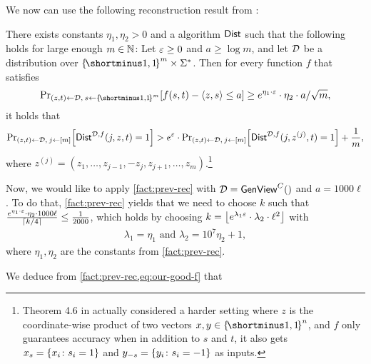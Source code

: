 We now can use the following reconstruction result from \cite{HaitnerMST22}:


\begin{fact}\label{fact:prev-rec}
	There exists constants $\eta_1,\eta_2 > 0$ and a \ppt algorithm $\mathsf{Dist}$ such that the following holds for large enough $m \in {\mathbb{N}}$: Let $\varepsilon \geq 0$ and $a \geq \log m$, and let ${\cal D}$ be a distribution over $\oo^m \times \Sigma^*$. Then for every function $f$ that satisfies 
	\begin{align*}
		\ppr{(z,t) \la \cD, \: s \la \oo^m}{f(s,t) - \ip{z,s} \leq a} \geq e^{\eta_1 \cdot \eps}\cdot \eta_2 \cdot a/\sqrt{m},
	\end{align*}
	it holds that
	\begin{align*}
		\ppr{(z,t) \la \cD, \: j \la [m]}{\Dist^{\cD,f}(j, z, t) = 1} > e^{\eps}\cdot \ppr{(z,t) \la \cD, \: j \la [m]}{\Dist^{\cD,f}(j ,z^{(j)}, t) = 1} + \frac1m,
	\end{align*}
	where $z^{(j)} = (z_1,\ldots,z_{j-1},-z_j,z_{j+1},\ldots,z_m)$.\footnote{Theorem 4.6 in \cite{HaitnerMST22} actually considered a harder setting where $z$ is the coordinate-wise product of two vectors $x,y \in \oo^n$, and $f$ only guarantees accuracy when in addition to $s$ and $t$, it also gets $x_{s} = \set{x_i \colon s_i = 1}$ and $y_{-s} = \set{y_i \colon s_i = -1}$ as inputs.}
\end{fact}



Now, we would like to apply \cref{fact:prev-rec} with ${\cal D} = \mathsf{GenView}^C()$ and $a = 1000 \ell$. To do that, \cref{fact:prev-rec} yields that we need to choose $k$ such that $\frac{e^{\eta_1 \cdot \eps}\cdot \eta_2  \cdot 1000\ell}{\ceil{k/4}} \leq \frac1{2000}$, which holds by choosing $k = \floor{e^{\lambda_1 \eps}\cdot \lambda_2 \cdot \ell^2}$ with 
\begin{align}\label{eq:lamdas}
	\lambda_1 = \eta_1 \text{ and }\lambda_2 = 10^7 \eta_2 + 1,
\end{align}
where $\eta_1,\eta_2$ are the constants from \cref{fact:prev-rec}.

We deduce from \cref{fact:prev-rec,eq:our-good-f} that 

